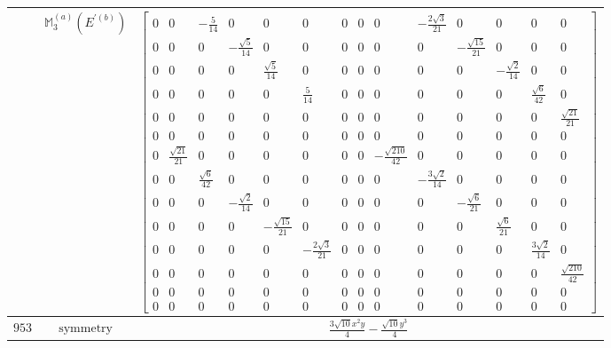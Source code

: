 \documentclass[fleqn,8pt,landscape]{jsarticle}
\begin{document}
\begin{longtable}{ccc}
$  $ & $ \mathbb{M}_{3}^{(a)}(E^{\prime(b)}) $ & $ \begin{bmatrix} 0 & 0 & - \frac{5}{14} & 0 & 0 & 0 & 0 & 0 & 0 & - \frac{2 \sqrt{3}}{21} & 0 & 0 & 0 & 0 \\ 0 & 0 & 0 & - \frac{\sqrt{5}}{14} & 0 & 0 & 0 & 0 & 0 & 0 & - \frac{\sqrt{15}}{21} & 0 & 0 & 0 \\ 0 & 0 & 0 & 0 & \frac{\sqrt{5}}{14} & 0 & 0 & 0 & 0 & 0 & 0 & - \frac{\sqrt{2}}{14} & 0 & 0 \\ 0 & 0 & 0 & 0 & 0 & \frac{5}{14} & 0 & 0 & 0 & 0 & 0 & 0 & \frac{\sqrt{6}}{42} & 0 \\ 0 & 0 & 0 & 0 & 0 & 0 & 0 & 0 & 0 & 0 & 0 & 0 & 0 & \frac{\sqrt{21}}{21} \\ 0 & 0 & 0 & 0 & 0 & 0 & 0 & 0 & 0 & 0 & 0 & 0 & 0 & 0 \\ 0 & \frac{\sqrt{21}}{21} & 0 & 0 & 0 & 0 & 0 & 0 & - \frac{\sqrt{210}}{42} & 0 & 0 & 0 & 0 & 0 \\ 0 & 0 & \frac{\sqrt{6}}{42} & 0 & 0 & 0 & 0 & 0 & 0 & - \frac{3 \sqrt{2}}{14} & 0 & 0 & 0 & 0 \\ 0 & 0 & 0 & - \frac{\sqrt{2}}{14} & 0 & 0 & 0 & 0 & 0 & 0 & - \frac{\sqrt{6}}{21} & 0 & 0 & 0 \\ 0 & 0 & 0 & 0 & - \frac{\sqrt{15}}{21} & 0 & 0 & 0 & 0 & 0 & 0 & \frac{\sqrt{6}}{21} & 0 & 0 \\ 0 & 0 & 0 & 0 & 0 & - \frac{2 \sqrt{3}}{21} & 0 & 0 & 0 & 0 & 0 & 0 & \frac{3 \sqrt{2}}{14} & 0 \\ 0 & 0 & 0 & 0 & 0 & 0 & 0 & 0 & 0 & 0 & 0 & 0 & 0 & \frac{\sqrt{210}}{42} \\ 0 & 0 & 0 & 0 & 0 & 0 & 0 & 0 & 0 & 0 & 0 & 0 & 0 & 0 \\ 0 & 0 & 0 & 0 & 0 & 0 & 0 & 0 & 0 & 0 & 0 & 0 & 0 & 0 \end{bmatrix} $ \\ \hline
$ 953 $ & $ \text{symmetry} $ & $ \frac{3 \sqrt{10} x^{2} y}{4} - \frac{\sqrt{10} y^{3}}{4} $ \\

\end{longtable}
\end{document}
